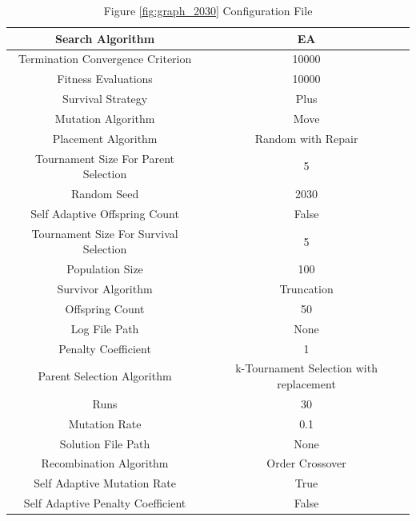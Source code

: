 \documentclass{standalone}
\begin{document}
\begin{table}[!htb]
	\centering
	\caption{Figure \ref{fig:graph_2030} Configuration File}
	\label{tab:graph_2030}
	\begin{tabular}{| c | c |}
		\hline
		Search Algorithm		& EA		 \\
		\hline
		Termination Convergence Criterion		& 10000		 \\
		\hline
		Fitness Evaluations		& 10000		 \\
		\hline
		Survival Strategy		& Plus		 \\
		\hline
		Mutation Algorithm		& Move		 \\
		\hline
		Placement Algorithm		& Random with Repair		 \\
		\hline
		Tournament Size For Parent Selection		& 5		 \\
		\hline
		Random Seed		& 2030		 \\
		\hline
		Self Adaptive Offspring Count		& False		 \\
		\hline
		Tournament Size For Survival Selection		& 5		 \\
		\hline
		Population Size		& 100		 \\
		\hline
		Survivor Algorithm		& Truncation		 \\
		\hline
		Offspring Count		& 50		 \\
		\hline
		Log File Path		& None		 \\
		\hline
		Penalty Coefficient		& 1		 \\
		\hline
		Parent Selection Algorithm		& k-Tournament Selection with replacement		 \\
		\hline
		Runs		& 30		 \\
		\hline
		Mutation Rate		& 0.1		 \\
		\hline
		Solution File Path		& None		 \\
		\hline
		Recombination Algorithm		& Order Crossover		 \\
		\hline
		Self Adaptive Mutation Rate		& True		 \\
		\hline
		Self Adaptive Penalty Coefficient		& False		 \\
		\hline
	\end{tabular}
\end{table}
\end{document}
